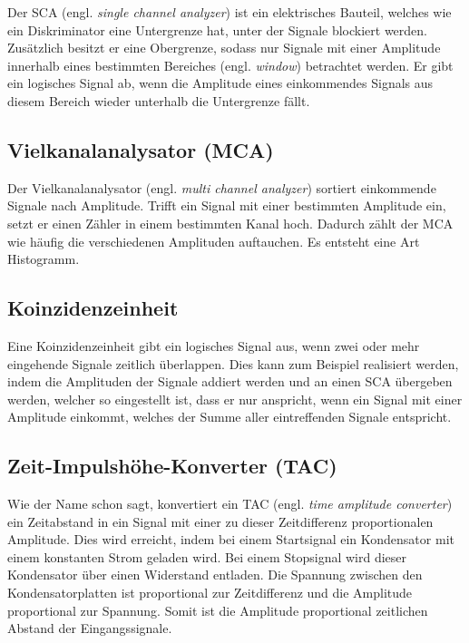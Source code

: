 Der SCA (engl. \emph{single channel analyzer}) ist ein elektrisches Bauteil,
welches wie ein Diskriminator eine Untergrenze hat, unter der Signale blockiert
werden. Zusätzlich besitzt er eine Obergrenze, sodass nur Signale mit einer
Amplitude innerhalb eines bestimmten Bereiches (engl. \emph{window}) betrachtet
werden. Er gibt ein logisches Signal ab, wenn die Amplitude eines einkommendes
Signals aus diesem Bereich wieder unterhalb die Untergrenze fällt.

\subsection{Vielkanalanalysator (MCA)}

Der Vielkanalanalysator (engl. \emph{multi channel analyzer}) sortiert
einkommende Signale nach Amplitude. Trifft ein Signal mit einer bestimmten
Amplitude ein, setzt er einen Zähler in einem bestimmten Kanal hoch. Dadurch
zählt der MCA wie häufig die verschiedenen Amplituden auftauchen. Es entsteht
eine Art Histogramm.

\subsection{Koinzidenzeinheit}

Eine Koinzidenzeinheit gibt ein logisches Signal aus, wenn zwei oder mehr
eingehende Signale zeitlich überlappen. Dies kann zum Beispiel realisiert
werden, indem die Amplituden der Signale addiert werden und an einen SCA
übergeben werden, welcher so eingestellt ist, dass er nur anspricht, wenn ein
Signal mit einer Amplitude einkommt, welches der Summe aller eintreffenden
Signale entspricht.

\subsection{Zeit-Impulshöhe-Konverter (TAC)}

Wie der Name schon sagt, konvertiert ein TAC (engl. \emph{time amplitude
converter}) ein Zeitabstand in ein Signal mit einer zu dieser Zeitdifferenz
proportionalen Amplitude. Dies wird erreicht, indem bei einem Startsignal ein
Kondensator mit einem konstanten Strom geladen wird. Bei einem Stopsignal wird
dieser Kondensator über einen Widerstand entladen. Die Spannung zwischen den
Kondensatorplatten ist proportional zur Zeitdifferenz und die Amplitude
proportional zur Spannung. Somit ist die Amplitude proportional zeitlichen
Abstand der Eingangssignale.

